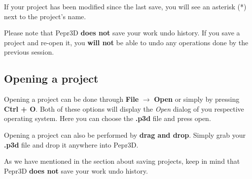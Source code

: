 If your project has been modified since the last save, you will see an asterisk (*) next to the project's name.

Please note that Pepr3D \textbf{does not} save your work undo history. If you save a project and re-open it, you \textbf{will not} be able to undo any operations done by the previous session.

\subsection{Opening a project}

Opening a project can be done through \textbf{File} $\rightarrow$ \textbf{Open} or simply by pressing \textbf{Ctrl + O}. Both of these options will display the \textit{Open} dialog of you respective operating system. Here you can choose the \textbf{.p3d} file and press open.

Opening a project can also be performed by \textbf{drag and drop}. Simply grab your \textbf{.p3d} file and drop it anywhere into Pepr3D.

As we have mentioned in the section about saving projects, keep in mind that Pepr3D \textbf{does not} save your work undo history.
